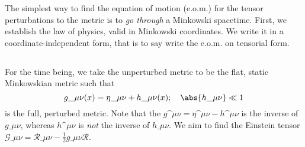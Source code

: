 




The simplest way to find the equation of motion (e.o.m.) for the tensor perturbations to the metric is to \textit{go through} a Minkowski spacetime. First, we establish the law of physics, valid in Minkowski coordinates. We write it in a coordinate-independent form, that is to say write the e.o.m. on tensorial form.  



\subsection{}
    For the time being, we take the unperturbed metric to be the flat, static Minkowskian metric such that
    \begin{equation}
        g\_{\mu\nu}(x) = \eta\_{\mu\nu} + h\_{\mu\nu}(x); \quad \abs{h\_{\mu\nu}} \ll 1
    \end{equation}
    is the full, perturbed metric. Note that the $g\^{\mu\nu}=\eta\^{\mu\nu}-h\^{\mu\nu}$ is the inverse of $g\_{\mu\nu}$, whereas $h\^{\mu\nu}$ is \emph{not} the inverse of $ h\_{\mu\nu}$. We aim to find the Einstein tensor $\mathcal{G}\_{\mu\nu} = \mathcal{R}\_{\mu\nu} - \frac{1}{2}g\_{\mu\nu} \mathcal{R}$. %

